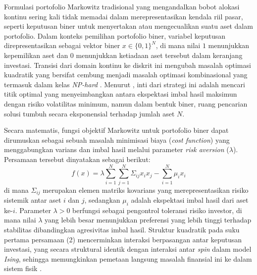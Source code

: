 Formulasi portofolio Markowitz tradisional yang mengandalkan bobot alokasi kontinu sering kali tidak memadai dalam merepresentasikan kendala riil pasar, seperti keputusan biner untuk menyertakan atau mengecualikan suatu aset dalam portofolio. Dalam konteks pemilihan portofolio biner, variabel keputusan direpresentasikan sebagai vektor biner $x \in \{0, 1\}^N$, di mana nilai $1$ menunjukkan kepemilikan aset dan $0$ menunjukkan ketiadaan aset tersebut dalam keranjang investasi. Transisi dari domain kontinu ke diskrit ini mengubah masalah optimasi kuadratik yang bersifat cembung menjadi masalah optimasi kombinasional yang termasuk dalam kelas \textit{NP-hard} \cite{sarkar_quantum_2018}. Menurut \cite{markowitz_portfolio_1952}, inti dari strategi ini adalah mencari titik optimal yang menyeimbangkan antara ekspektasi imbal hasil maksimun dengan risiko volatilitas minimum, namun dalam bentuk biner, ruang pencarian solusi tumbuh secara eksponensial terhadap jumlah aset $N$.

Secara matematis, fungsi objektif Markowitz untuk portofolio biner dapat dirumuskan sebagai sebuah masalah minimisasi biaya (\textit{cost function}) yang menggabungkan varians dan imbal hasil melalui parameter \textit{risk aversion} ($\lambda$). Persamaan tersebut dinyatakan sebagai berikut:
\begin{equation}
    f(x) = \lambda \sum_{i=1}^{N} \sum_{j=1}^{N} \Sigma_{ij} x_i x_j - \sum_{i=1}^{N} \mu_i x_i
\end{equation}
di mana $\Sigma_{ij}$ merupakan elemen matriks kovarians yang merepresentasikan risiko sistemik antar aset $i$ dan $j$, sedangkan $\mu_i$ adalah ekspektasi imbal hasil dari aset ke-$i$. Parameter $\lambda > 0$ berfungsi sebagai pengontrol toleransi risiko investor, di mana nilai $\lambda$ yang lebih besar menunjukkan preferensi yang lebih tinggi terhadap stabilitas dibandingkan agresivitas imbal hasil. Struktur kuadratik pada suku pertama persamaan (2) mencerminkan interaksi berpasangan antar keputusan investasi, yang secara struktural identik dengan interaksi antar \textit{spin} dalam model \textit{Ising}, sehingga memungkinkan pemetaan langsung masalah finansial ini ke dalam sistem fisik \cite{lucas_ising_2014}.

